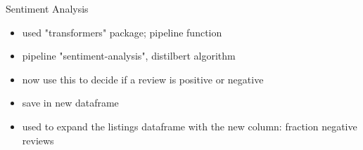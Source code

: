 \documentclass[12pt, letterpaper]{article}
\begin{document}
Sentiment Analysis

\begin{itemize}
    \item used "transformers" package; pipeline function
    \item pipeline "sentiment-analysis", distilbert algorithm
    \item now use this to decide if a review is positive or negative
    \item save in new dataframe
    \item used to expand the listings dataframe with the new column: fraction negative reviews
\end{itemize}
\end{document}
